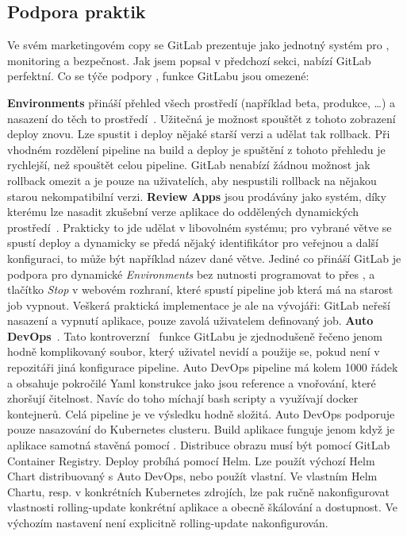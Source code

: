     \subsection{Podpora \CD praktik}
        Ve svém marketingovém copy se GitLab prezentuje jako jednotný systém pro \CICD, monitoring a bezpečnost. Jak jsem popsal v předchozí sekci, \CI nabízí GitLab perfektní. Co se týče podpory \CD, funkce GitLabu jsou omezené:

        \textbf{Environments} přináší přehled všech prostředí (například beta, produkce, \ldots) a nasazení do těch to prostředí~\cite{gitlab-environments}. Užitečná je možnost spouštět z tohoto zobrazení deploy znovu. Lze spustit i deploy nějaké starší verzi a udělat tak rollback. Při vhodném rozdělení pipeline na build a deploy je spuštění z tohoto přehledu je rychlejší, než spouštět celou pipeline. GitLab nenabízí žádnou možnost jak rollback omezit a je pouze na uživatelích, aby nespustili rollback na nějakou starou nekompatibilní verzi.
        \textbf{Review Apps} jsou prodávány jako systém, díky kterému lze nasadit zkušební verze aplikace do oddělených dynamických prostředí~\cite{gitlab-review-apps}. Prakticky to jde udělat v libovolném \CI systému; pro vybrané větve se spustí deploy a dynamicky se předá nějaký identifikátor pro veřejnou  a další konfiguraci, to může být například název dané větve. Jediné co přináší GitLab je podpora pro dynamické \textit{Environments} bez nutnosti programovat to přes , a tlačítko \textit{Stop} v webovém rozhraní, které spustí pipeline job která má na starost job vypnout. Veškerá praktická implementace je ale na vývojáři: GitLab neřeší nasazení a vypnutí aplikace, pouze zavolá uživatelem definovaný job.
        \textbf{Auto DevOps}~\cite{gitlab-auto-devops}. Tato kontroverzní~\cite{gitlab-auto-devops-forum} funkce GitLabu je zjednodušeně řečeno jenom hodně komplikovaný  soubor, který uživatel nevidí a použije se, pokud není v repozitáři jiná konfigurace pipeline. Auto DevOps pipeline má kolem 1000 řádek a obsahuje pokročilé Yaml konstrukce jako jsou reference a vnořování, které zhoršují čitelnost. Navíc do toho míchají bash scripty a využívají docker kontejnerů. Celá pipeline je ve výsledku hodně složitá. Auto DevOps podporuje pouze nasazování do Kubernetes clusteru. Build aplikace funguje jenom když je aplikace samotná stavěná pomocí . Distribuce obrazu musí být pomocí GitLab Container Registry. Deploy probíhá pomocí Helm. Lze použít výchozí Helm Chart distribuovaný s Auto DevOps, nebo použít vlastní. Ve vlastním Helm Chartu, resp. v konkrétních Kubernetes zdrojích, lze pak ručně nakonfigurovat vlastnosti rolling-update konkrétní aplikace a obecně škálování a dostupnost. Ve výchozím nastavení není explicitně rolling-update nakonfigurován.

